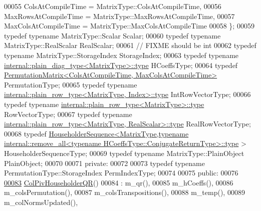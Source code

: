 \begin{DoxyCode}
00055       ColsAtCompileTime = MatrixType::ColsAtCompileTime,
00056       MaxRowsAtCompileTime = MatrixType::MaxRowsAtCompileTime,
00057       MaxColsAtCompileTime = MatrixType::MaxColsAtCompileTime
00058     \};
00059     \textcolor{keyword}{typedef} \textcolor{keyword}{typename} MatrixType::Scalar Scalar;
00060     \textcolor{keyword}{typedef} \textcolor{keyword}{typename} MatrixType::RealScalar RealScalar;
00061     \textcolor{comment}{// FIXME should be int}
00062     \textcolor{keyword}{typedef} \textcolor{keyword}{typename} MatrixType::StorageIndex StorageIndex;
00063     \textcolor{keyword}{typedef} \textcolor{keyword}{typename} \hyperlink{class_eigen_1_1internal_1_1_tensor_lazy_evaluator_writable}{internal::plain\_diag\_type<MatrixType>::type}
       HCoeffsType;
00064     \textcolor{keyword}{typedef} \hyperlink{group___core___module}{PermutationMatrix<ColsAtCompileTime, MaxColsAtCompileTime>}
       PermutationType;
00065     \textcolor{keyword}{typedef} \textcolor{keyword}{typename} \hyperlink{class_eigen_1_1internal_1_1_tensor_lazy_evaluator_writable}{internal::plain\_row\_type<MatrixType, Index>::type}
       IntRowVectorType;
00066     \textcolor{keyword}{typedef} \textcolor{keyword}{typename} \hyperlink{class_eigen_1_1internal_1_1_tensor_lazy_evaluator_writable}{internal::plain\_row\_type<MatrixType>::type} 
      RowVectorType;
00067     \textcolor{keyword}{typedef} \textcolor{keyword}{typename} \hyperlink{class_eigen_1_1internal_1_1_tensor_lazy_evaluator_writable}{internal::plain\_row\_type<MatrixType, RealScalar>::type}
       RealRowVectorType;
00068     \textcolor{keyword}{typedef} 
      \hyperlink{group___householder___module_class_eigen_1_1_householder_sequence}{HouseholderSequence<MatrixType,typename internal::remove\_all<typename
       HCoeffsType::ConjugateReturnType>::type}
      > HouseholderSequenceType;
00069     \textcolor{keyword}{typedef} \textcolor{keyword}{typename} MatrixType::PlainObject PlainObject;
00070 
00071   \textcolor{keyword}{private}:
00072 
00073     \textcolor{keyword}{typedef} \textcolor{keyword}{typename} PermutationType::StorageIndex PermIndexType;
00074 
00075   \textcolor{keyword}{public}:
00076 
\hyperlink{group___q_r___module_a9d8a92c2a2f0debe5454812372237ed4}{00083}     \hyperlink{group___q_r___module_a9d8a92c2a2f0debe5454812372237ed4}{ColPivHouseholderQR}()
00084       : m\_qr(),
00085         m\_hCoeffs(),
00086         m\_colsPermutation(),
00087         m\_colsTranspositions(),
00088         m\_temp(),
00089         m\_colNormsUpdated(),

\end{DoxyCode}
